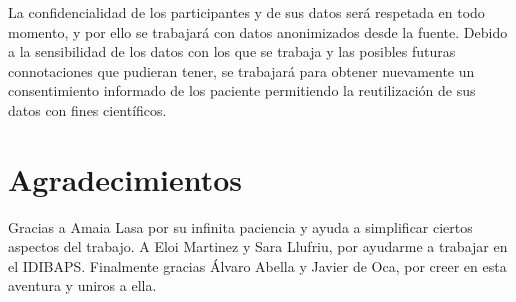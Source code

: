 \documentclass[fleqn,12pt]{uicarticle} %
\begin{document}
La confidencialidad de los participantes y de sus datos será respetada en todo momento, y por ello se trabajará con datos anonimizados desde la fuente. Debido a la sensibilidad de los datos con los que se trabaja y las posibles futuras connotaciones que pudieran tener, se trabajará para obtener nuevamente un consentimiento informado de los paciente permitiendo la reutilización de sus datos con fines científicos.


\section*{Agradecimientos}
Gracias a Amaia Lasa por su infinita paciencia y ayuda a simplificar ciertos aspectos del trabajo. A Eloi Martinez y Sara Llufriu, por ayudarme a trabajar en el IDIBAPS. Finalmente gracias Álvaro Abella y Javier de Oca, por creer en esta aventura y uniros a ella.
\endgroup






\end{document}
